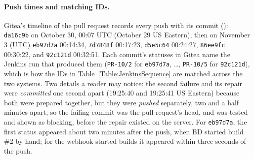 \paragraph{Push times and matching IDs.} Gitea's timeline of the pull request records every push with its commit
(): \texttt{da16c9b} on October 30, 00:07 UTC (October 29 US Eastern), then on November 3 (UTC) \texttt{eb97d7a} 00:14:34,
\texttt{7d7848f} 00:17:23, \texttt{d5e5c64} 00:24:27, \texttt{86ee9fc} 00:30:22, and \texttt{92c121d} 00:32:51. Each commit's statuses in Gitea
name the Jenkins run that produced them (\texttt{PR-10/2} for \texttt{eb97d7a}, \dots, \texttt{PR-10/5} for \texttt{92c121d}), which is how the IDs in
Table~\ref{Table:JenkinsSequence} are matched across the two systems. Two details a reader may notice: the second failure and its
repair were \emph{committed} one second apart (19:25:40 and 19:25:41 US Eastern) because both were prepared together, but they were
\emph{pushed} separately, two and a half minutes apart, so the failing commit was the pull request's head, and was tested and shown as
blocking, before the repair existed on the server. For \texttt{eb97d7a}, the first status appeared about two minutes after the push,
when BD started build \#2 by hand; for the webhook-started builds it appeared within three seconds of the push.

\begin{longlisting}
\inputminted[fontsize=\scriptsize]{text}{evidence/107-pr10-timeline-pushes-review-merge-and-commit-statuses-2026-11-03.txt}
\caption{Pull request \#10 from Gitea's API without a token, November 3, 2026: pushes with commit IDs, the review request,
SD's approval, the merge, issue \#9's closure, every commit status with its Jenkins run, and the branch rule (real output).}
\label{Listing:E107}
\end{longlisting}

\begin{longlisting}
\inputminted[fontsize=\scriptsize]{text}{evidence/96-jenkins-pr10-build-4-second-controlled-failure-webhook-triggered-2026-11-02.txt}
\caption{Build \#4, the second controlled failure (commit \texttt{86ee9fc}): cause, failing test, and Gitea statuses (real output).}
\label{Listing:E96}
\end{longlisting}

\begin{longlisting}
\inputminted[fontsize=\scriptsize]{text}{evidence/99-jenkins-pr10-build-5-repair-webhook-triggered-success-2026-11-02.txt}
\caption{Build \#5, the repair (commit \texttt{92c121d}): cause, passing tests, Gitea statuses, and all builds so far (real output).}
\label{Listing:E99}
\end{longlisting}

